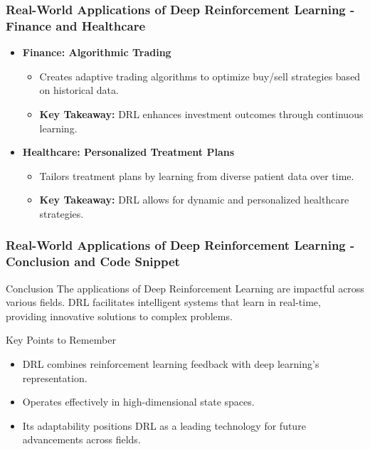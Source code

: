 \documentclass[aspectratio=169]{beamer}
\begin{document}
\begin{frame}[fragile]
    \frametitle{Real-World Applications of Deep Reinforcement Learning - Finance and Healthcare}
    \begin{itemize}
        \item \textbf{Finance: Algorithmic Trading}
            \begin{itemize}
                \item Creates adaptive trading algorithms to optimize buy/sell strategies based on historical data.
                \item \textbf{Key Takeaway:} DRL enhances investment outcomes through continuous learning.
            \end{itemize}
            
        \item \textbf{Healthcare: Personalized Treatment Plans}
            \begin{itemize}
                \item Tailors treatment plans by learning from diverse patient data over time.
                \item \textbf{Key Takeaway:} DRL allows for dynamic and personalized healthcare strategies.
            \end{itemize}
    \end{itemize}
\end{frame}

\begin{frame}[fragile]
    \frametitle{Real-World Applications of Deep Reinforcement Learning - Conclusion and Code Snippet}
    \begin{block}{Conclusion}
        The applications of Deep Reinforcement Learning are impactful across various fields. DRL facilitates intelligent systems that learn in real-time, providing innovative solutions to complex problems.
    \end{block}
    
    \begin{block}{Key Points to Remember}
        \begin{itemize}
            \item DRL combines reinforcement learning feedback with deep learning's representation.
            \item Operates effectively in high-dimensional state spaces.
            \item Its adaptability positions DRL as a leading technology for future advancements across fields.
        \end{itemize}
    \end{block}
\end{frame}
\end{document}
